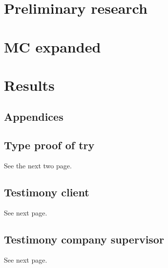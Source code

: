 \part{Preliminary research}
   

   

\newpage
\part{MC expanded}\label{part:mcexpanded}
   

   
   

   


\part{Results}
   

   
   


\begin{appendices}
   \part{Appendices}

   \chapter{Type proof of try}
   See the next two page.
   
   

   \chapter{Testimony client}
   See next page.
	

   \chapter{Testimony company supervisor}
   See next page.
	
\end{appendices}


